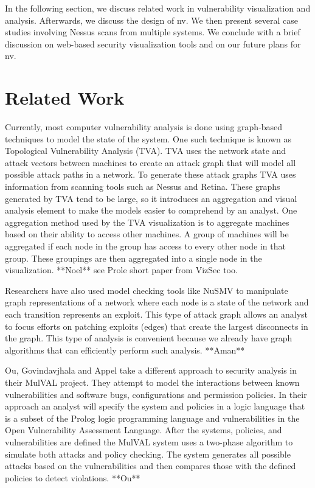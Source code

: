 \documentclass{acm_proc_article-sp}
\begin{document}
In the following section, we discuss related work in vulnerability visualization and analysis. Afterwards, we discuss the design of nv. We then present several case studies involving Nessus scans from multiple systems. We conclude with a brief discussion on web-based security visualization tools and on our future plans for nv.

\section{Related Work}

Currently, most computer vulnerability analysis is done using graph-based
techniques to model the state of the system. One such technique is known as
Topological Vulnerability Analysis (TVA). TVA uses the network state and attack
vectors between machines to create an attack graph that will model all possible attack paths in a
network. To generate these attack graphs TVA uses information from scanning
tools such as Nessus and Retina. These graphs generated by TVA tend to be 
large, so it introduces an aggregation and visual analysis element to make the
models easier to comprehend by an analyst. One aggregation method used by the TVA
visualization is to aggregate machines based on their ability to access other machines. A group of
machines will be aggregated if each node in the group has access to every other
node in that group.
These groupings are then aggregated into a single node in the visualization.
**Noel** see Prole short paper from VizSec too.

Researchers have also used model checking tools like NuSMV to manipulate graph
representations of a network where each node is a state of the network and each
transition represents an exploit.  This type of attack graph allows an analyst
to focus efforts on patching exploits (edges) that create the largest
disconnects in the graph. This type of analysis is convenient because we
already have graph algorithms that can efficiently perform such analysis.
**Aman**

Ou, Govindavjhala and Appel take a different approach to security analysis in
their MulVAL project.
They attempt to model the interactions between known vulnerabilities and
software bugs, configurations and permission policies.  In their approach an
analyst will specify the system and policies in a logic language that is a subset of the
Prolog logic programming language and vulnerabilities in the Open Vulnerability
Assessment Language. After the systems, policies, and vulnerabilities are defined
the MulVAL system uses a two-phase algorithm to simulate both attacks and policy
checking. The system generates all possible attacks based on the
vulnerabilities and then compares those with the defined policies to detect
violations.
**Ou**
\end{document}
